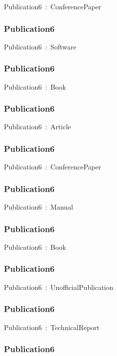 \documentclass{article}
\begin{document}
Publication6~:~ConferencePaper

\subsubsection*{Publication6}

Publication6~:~Software

\subsubsection*{Publication6}

Publication6~:~Book

\subsubsection*{Publication6}

Publication6~:~Article

\subsubsection*{Publication6}

Publication6~:~ConferencePaper

\subsubsection*{Publication6}

Publication6~:~Manual

\subsubsection*{Publication6}

Publication6~:~Book

\subsubsection*{Publication6}

Publication6~:~UnofficialPublication

\subsubsection*{Publication6}

Publication6~:~TechnicalReport

\subsubsection*{Publication6}
\end{document}
